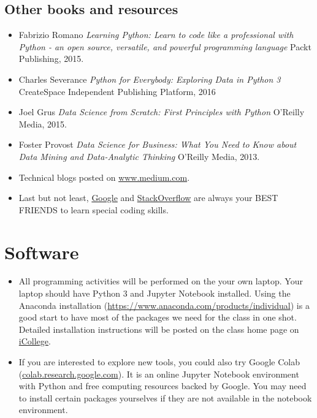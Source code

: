\documentclass{article}
\begin{document}
\subsection{Other books and resources}
  \begin{itemize}
  	\item Fabrizio Romano  \textit{Learning Python: Learn to code like a professional with Python - an open source, versatile, and powerful programming language} Packt Publishing, 2015.
  	\item Charles Severance \textit{Python for Everybody: Exploring Data in Python 3} CreateSpace Independent Publishing Platform, 2016 
    \item Joel Grus \textit{Data Science from Scratch: First Principles with Python} O'Reilly Media, 2015.
    \item Foster Provost \textit{Data Science for Business: What You Need to Know about Data Mining and Data-Analytic Thinking} O'Reilly Media, 2013.
    \item Technical blogs posted on \url{www.medium.com}.
    \item Last but not least, \href{www.google.com}{Google} and \href{www.stackoverflow.com}{StackOverflow} are always your BEST FRIENDS to learn special coding skills.
  \end{itemize}


\section{Software}
\begin{itemize}
	\item All programming activities will be performed on the your own laptop. Your laptop should have Python 3 and Jupyter Notebook installed. Using the Anaconda installation (\url{https://www.anaconda.com/products/individual}) is a good start to have most of the packages we need for the class in one shot. Detailed installation instructions will be posted on the class home page on \href{https://gastate.view.usg.edu/d2l/home/2822689}{iCollege}.
	\item If you are interested to explore new tools, you could also try Google Colab (\url{colab.research.google.com}). It is an online Jupyter Notebook environment with Python and free computing resources backed by Google. You may need to install certain packages yourselves if they are not available in the notebook environment.
\end{itemize}
\end{document}
